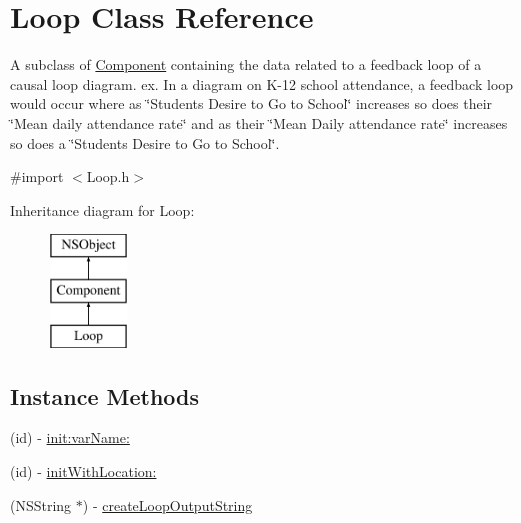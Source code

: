 \hypertarget{interface_loop}{\section{Loop Class Reference}
\label{interface_loop}
}


A subclass of \hyperlink{interface_component}{Component} containing the data related to a feedback loop of a causal loop diagram. ex. In a diagram on K-\/12 school attendance, a feedback loop would occur where as \char`\"{}\-Students Desire to Go to School\char`\"{} increases so does their \char`\"{}\-Mean daily attendance rate\char`\"{} and as their \char`\"{}\-Mean Daily attendance rate\char`\"{} increases so does a \char`\"{}\-Students Desire to Go to School\char`\"{}.  




{\ttfamily \#import $<$Loop.\-h$>$}

Inheritance diagram for Loop\-:\begin{figure}[H]
\begin{center}
\leavevmode
\includegraphics[height=3.000000cm]{interface_loop}
\end{center}
\end{figure}
\subsection*{Instance Methods}
\begin{DoxyCompactItemize}
\item 
(id) -\/ \hyperlink{interface_loop_ad35655514796f99b2f95f9d97ee9cbc1}{init\-:var\-Name\-:}
\item 
(id) -\/ \hyperlink{interface_loop_a9755af4c66523c228c80713cab6396fe}{init\-With\-Location\-:}
\item 
(N\-S\-String $\ast$) -\/ \hyperlink{interface_loop_a404a48142c96cacac68633e2d2c00701}{create\-Loop\-Output\-String}
\end{DoxyCompactItemize}

